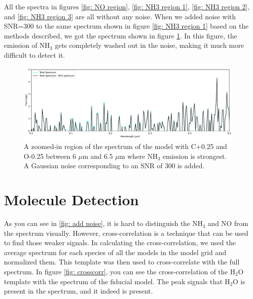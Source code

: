\documentclass[oneside, single, authoryear, semicolon]{lion-msc}
\newcommand{\4}{$_4$}
\newcommand{\3}{$_3$}
\newcommand{\2}{$_2$}
\begin{document}
All the spectra in figures \ref{fig: NO region}, \ref{fig: NH3 region 1}, \ref{fig: NH3 region 2}, and \ref{fig: NH3 region 3} are all without any noise. When we added noise with SNR=300 to the same spectrum shown in figure \ref{fig: NH3 region 1} based on the methods described, we got the spectrum shown in figure \ref{fig: add noise}. In this figure, the emission of NH\3 gets completely washed out in the noise, making it much more difficult to detect it.  

\begin{figure}[!ht]
    \centering
    \includegraphics[width=\linewidth]{Figures/AddNoise.pdf}
    \caption{A zoomed-in region of the spectrum of the model with C+0.25 and O-0.25 between 6 $\mu$m and 6.5 $\mu$m where NH\3 emission is strongest. A Gaussian noise corresponding to an SNR of 300 is added.}
    \label{fig: add noise}
\end{figure}

\section{Molecule Detection}
As you can see in \autoref{fig: add noise}, it is hard to distinguish the NH\3 and NO from the spectrum visually. However, cross-correlation is a technique that can be used to find those weaker signals. In calculating the cross-correlation, we used the average spectrum for each species of all the models in the model grid and normalized them. This template was then used to cross-correlate with the full spectrum. In figure \ref{fig: crosscorr}, you can see the cross-correlation of the H\2O template with the spectrum of the fiducial model. The peak signals that H\2O is present in the spectrum, and it indeed is present. 
\end{document}
